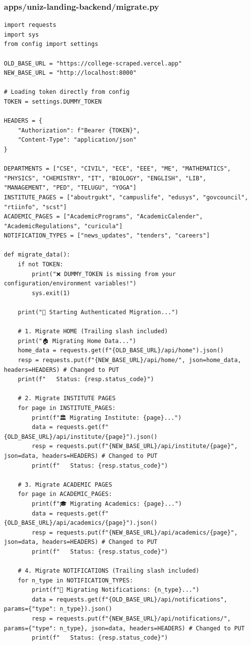 \documentclass[11pt,a4paper,oneside]{article}
\begin{document}
\subsubsection*{apps/uniz-landing-backend/migrate.py}
\begin{lstlisting}
import requests
import sys
from config import settings

OLD_BASE_URL = "https://college-scraped.vercel.app"
NEW_BASE_URL = "http://localhost:8000"

# Loading token directly from config
TOKEN = settings.DUMMY_TOKEN

HEADERS = {
    "Authorization": f"Bearer {TOKEN}",
    "Content-Type": "application/json"
}

DEPARTMENTS = ["CSE", "CIVIL", "ECE", "EEE", "ME", "MATHEMATICS", "PHYSICS", "CHEMISTRY", "IT", "BIOLOGY", "ENGLISH", "LIB", "MANAGEMENT", "PED", "TELUGU", "YOGA"]
INSTITUTE_PAGES = ["aboutrgukt", "campuslife", "edusys", "govcouncil", "rtiinfo", "scst"]
ACADEMIC_PAGES = ["AcademicPrograms", "AcademicCalender", "AcademicRegulations", "curicula"]
NOTIFICATION_TYPES = ["news_updates", "tenders", "careers"]

def migrate_data():
    if not TOKEN:
        print("❌ DUMMY_TOKEN is missing from your configuration/environment variables!")
        sys.exit(1)

    print("🚀 Starting Authenticated Migration...")

    # 1. Migrate HOME (Trailing slash included)
    print("🏠 Migrating Home Data...")
    home_data = requests.get(f"{OLD_BASE_URL}/api/home").json()
    resp = requests.put(f"{NEW_BASE_URL}/api/home/", json=home_data, headers=HEADERS) # Changed to PUT
    print(f"   Status: {resp.status_code}")

    # 2. Migrate INSTITUTE PAGES
    for page in INSTITUTE_PAGES:
        print(f"🏛️ Migrating Institute: {page}...")
        data = requests.get(f"{OLD_BASE_URL}/api/institute/{page}").json()
        resp = requests.put(f"{NEW_BASE_URL}/api/institute/{page}", json=data, headers=HEADERS) # Changed to PUT
        print(f"   Status: {resp.status_code}")

    # 3. Migrate ACADEMIC PAGES
    for page in ACADEMIC_PAGES:
        print(f"🎓 Migrating Academics: {page}...")
        data = requests.get(f"{OLD_BASE_URL}/api/academics/{page}").json()
        resp = requests.put(f"{NEW_BASE_URL}/api/academics/{page}", json=data, headers=HEADERS) # Changed to PUT
        print(f"   Status: {resp.status_code}")

    # 4. Migrate NOTIFICATIONS (Trailing slash included)
    for n_type in NOTIFICATION_TYPES:
        print(f"🔔 Migrating Notifications: {n_type}...")
        data = requests.get(f"{OLD_BASE_URL}/api/notifications", params={"type": n_type}).json()
        resp = requests.put(f"{NEW_BASE_URL}/api/notifications/", params={"type": n_type}, json=data, headers=HEADERS) # Changed to PUT
        print(f"   Status: {resp.status_code}")


\end{lstlisting}
\end{document}
